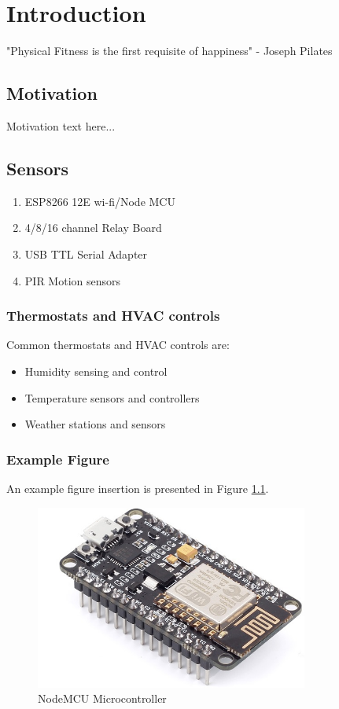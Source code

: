 

\chapter{Introduction}
"Physical Fitness is the first requisite of happiness" - Joseph Pilates


\section{Motivation}
Motivation text here... 

\section{Sensors}
\begin{enumerate}
\item ESP8266 12E wi-fi/Node MCU	
\item 4/8/16 channel Relay Board				
\item USB TTL Serial Adapter
\item PIR Motion sensors 
\end{enumerate}

\subsection{Thermostats and HVAC controls}
Common thermostats and HVAC controls  are:
\begin{itemize}
\item 	Humidity sensing and control  
\item 	Temperature sensors and controllers    
\item 	Weather stations and sensors  
\end{itemize}

\subsection{Example Figure}
An example figure insertion is presented  in  Figure \ref{fig1}.

\begin{figure}[H]
\begin{center}
\includegraphics[width=0.8\textwidth]{fig1}
\end{center}
\caption{NodeMCU Microcontroller}
\label{fig1}
\end{figure}

